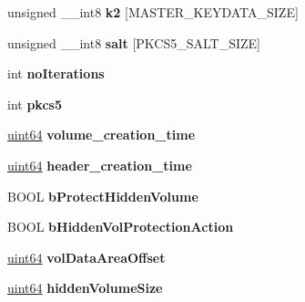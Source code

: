 \begin{DoxyCompactItemize}
unsigned \+\_\+\+\_\+int8 {\bfseries k2} \mbox{[}M\+A\+S\+T\+E\+R\+\_\+\+K\+E\+Y\+D\+A\+T\+A\+\_\+\+S\+I\+ZE\mbox{]}
\item 
\mbox{\label{struct_c_r_y_p_t_o___i_n_f_o__t_a01c8556fab73a760c43cb29a3ace1a35}} 
unsigned \+\_\+\+\_\+int8 {\bfseries salt} \mbox{[}P\+K\+C\+S5\+\_\+\+S\+A\+L\+T\+\_\+\+S\+I\+ZE\mbox{]}
\item 
\mbox{\label{struct_c_r_y_p_t_o___i_n_f_o__t_a64de795c31018c34f7278e2482e3ccaa}} 
int {\bfseries no\+Iterations}
\item 
\mbox{\label{struct_c_r_y_p_t_o___i_n_f_o__t_adc98d817e9856226490c3f21cb15f096}} 
int {\bfseries pkcs5}
\item 
\mbox{\label{struct_c_r_y_p_t_o___i_n_f_o__t_a8d9789f331bec44948bc7ee8cfad3e04}} 
\hyperlink{union_u_i_n_t64___s_t_r_u_c_t}{uint64} {\bfseries volume\+\_\+creation\+\_\+time}
\item 
\mbox{\label{struct_c_r_y_p_t_o___i_n_f_o__t_a9be5abdd8bc554fa011d7b73d2d98995}} 
\hyperlink{union_u_i_n_t64___s_t_r_u_c_t}{uint64} {\bfseries header\+\_\+creation\+\_\+time}
\item 
\mbox{\label{struct_c_r_y_p_t_o___i_n_f_o__t_acf83c5d5f69be9f4121dbb0cc1818cc6}} 
B\+O\+OL {\bfseries b\+Protect\+Hidden\+Volume}
\item 
\mbox{\label{struct_c_r_y_p_t_o___i_n_f_o__t_a2f9295b932eec51180f7f431143d40cf}} 
B\+O\+OL {\bfseries b\+Hidden\+Vol\+Protection\+Action}
\item 
\mbox{\label{struct_c_r_y_p_t_o___i_n_f_o__t_a1941e55e205b86f43bbda33240e028ff}} 
\hyperlink{union_u_i_n_t64___s_t_r_u_c_t}{uint64} {\bfseries vol\+Data\+Area\+Offset}
\item 
\mbox{\label{struct_c_r_y_p_t_o___i_n_f_o__t_a877212aa7a644fc46f2a1b78eef97160}} 
\hyperlink{union_u_i_n_t64___s_t_r_u_c_t}{uint64} {\bfseries hidden\+Volume\+Size}

\end{DoxyCompactItemize}
